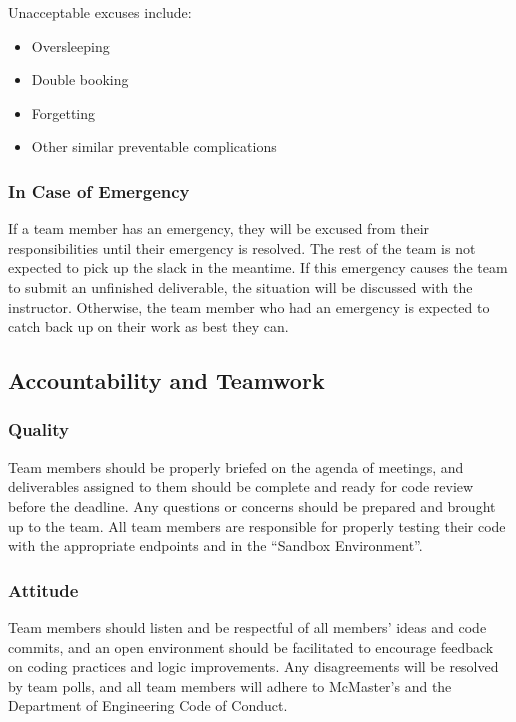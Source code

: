 \documentclass{article}
\begin{document}
Unacceptable excuses include:
\begin{itemize}
\item{Oversleeping}
\item{Double booking}
\item{Forgetting}
\item{Other similar preventable complications
}
\end{itemize}

\subsubsection*{In Case of Emergency}

If a team member has an emergency, they will be excused from their responsibilities until their emergency is resolved. The rest of the team is not expected to pick up the slack in the meantime. If this emergency causes the team to submit an unfinished deliverable, the situation will be discussed with the instructor. Otherwise, the team member who had an emergency is expected to catch back up on their work as best they can.

\subsection*{Accountability and Teamwork}

\subsubsection*{Quality} 

Team members should be properly briefed on the agenda of meetings, and deliverables assigned to them should be complete and ready for code review before the deadline. Any questions or concerns should be prepared and brought up to the team. All team members are responsible for properly testing their code with the appropriate endpoints and in the “Sandbox Environment”.

\subsubsection*{Attitude}

Team members should listen and be respectful of all members’ ideas and code commits, and an open environment should be facilitated to encourage feedback on coding practices and logic improvements. Any disagreements will be resolved by team polls, and all team members will adhere to McMaster’s and the Department of Engineering Code of Conduct.
\end{document}
